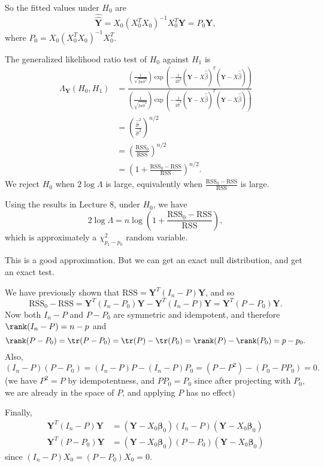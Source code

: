 \documentclass[a4paper]{article}
\begin{document}
So the fitted values under $H_0$ are
\[
  \hat{\hat{\mathbf{Y}}} = X_0(X_0^TX_0)^{-1}X_0^T \mathbf{Y} = P_0 \mathbf{Y},
\]
where $P_0 = X_0(X_0^T X_0)^{-1}X_0^T$.

The generalized likelihood ratio test of $H_0$ against $H_1$ is
\begin{align*}
  \Lambda_\mathbf{Y}(H_0, H_1) &= \frac{\left(\frac{1}{\sqrt{2\pi \hat{\sigma}^2}}\right)\exp\left(-\frac{1}{2\hat{\sigma}^2}(\mathbf{Y} - X\hat{\hat{\beta}})^T(\mathbf{Y} - X\hat{\hat{\beta}})\right)}{\left(\frac{1}{\sqrt{2\pi \hat{\hat{\sigma}}^2}}\right)\exp\left(-\frac{1}{2\hat{\hat{\sigma}}^2}(\mathbf{Y} - X\hat{\hat{\beta}})^T(\mathbf{Y} - X\hat{\hat{\beta}})\right)}\\
  &= \left(\frac{\hat{\hat{\sigma}}^2}{\hat{\sigma}^2}\right)^{n/2} \\
  &= \left(\frac{\text{RSS}_0}{\mathrm{RSS}}\right)^{n/2} \\
  &= \left(1 + \frac{\mathrm{RSS}_0 - \mathrm{RSS}}{\mathrm{RSS}}\right)^{n/2}.
\end{align*}
We reject $H_0$ when $2\log \Lambda$ is large, equivalently when $\frac{\mathrm{RSS}_0 - \mathrm{RSS}}{\mathrm{RSS}}$ is large.

Using the results in Lecture 8, under $H_0$, we have
\[
  2\log \Lambda = n\log\left(1 + \frac{\mathrm{RSS}_0 - \mathrm{RSS}}{\mathrm{RSS}}\right),
\]
which is approximately a $\chi_{p_1 - p_0}^2$ random variable.

This is a good approximation. But we can get an exact null distribution, and get an exact test.

We have previously shown that $\mathrm{RSS} = \mathbf{Y}^T(I_n - P)\mathbf{Y}$, and so
\[
  \mathrm{RSS}_0 - \mathrm{RSS} = \mathbf{Y}^T(I_n - P_0)\mathbf{Y} - \mathbf{Y}^T(I_n - P)\mathbf{Y} = \mathbf{Y}^T(P - P_0)\mathbf{Y}.
\]
Now both $I_n - P$ and $P - P_0$ are symmetric and idempotent, and therefore $\rank(I_n - P) = n - p$ and
\[
  \rank(P - P_0) = \tr(P - P_0) = \tr(P) - \tr(P_0) = \rank(P) - \rank(P_0) = p - p_0.
\]
Also,
\[
  (I_n - P)(P - P_0) = (I_n - P)P - (I_n - P)P_0 = (P - P^2) - (P_0 - PP_0) = 0.
\]
(we have $P^2 = P$ by idempotentness, and $PP_0 = P_0$  since after projecting with $P_0$, we are already in the space of $P$, and applying $P$ has no effect)

Finally,
\begin{align*}
  \mathbf{Y}^T(I_n - P)\mathbf{Y} &= (\mathbf{Y} - X_0 \boldsymbol\beta_0)(I_n - P)(\mathbf{Y} - X_0 \boldsymbol\beta_0)\\
  \mathbf{Y}^T(P - P_0)\mathbf{Y} &= (\mathbf{Y} - X_0 \boldsymbol\beta_0)(P - P_0)(\mathbf{Y} - X_0 \boldsymbol\beta_0)
\end{align*}
since $(I_n - P)X_0 = (P - P_0)X_0 = 0$.
\end{document}
